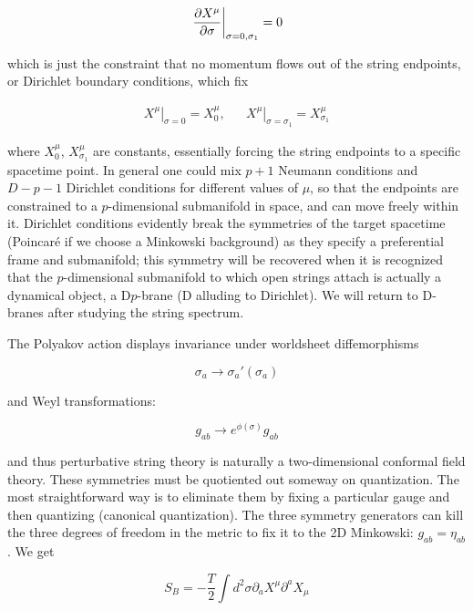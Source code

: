 \begin{equation}
	\left. \frac{\partial X^\mu}{\partial\sigma}\right|_{\sigma = 0,\sigma_1} = 0
	\label{}
\end{equation}

which is just the constraint that no momentum flows out of the string endpoints, or Dirichlet boundary conditions, which fix 

\begin{align}
	\left. X^\mu \right|_{\sigma=0} = X_0^\mu, && \left. X^\mu \right|_{\sigma=\sigma_1} = X^\mu_{\sigma_1}
	\label{}
\end{align}

where $X^\mu_0$, $X^\mu_{\sigma_1}$ are constants, essentially forcing the string endpoints to a specific spacetime point. In general one could mix $p+1$ Neumann conditions and $D-p-1$ Dirichlet conditions for different values of $\mu$, so that the endpoints are constrained to a $p$-dimensional submanifold in space, and can move freely within it. Dirichlet conditions evidently break the symmetries of the target spacetime (Poincar\'e if we choose a Minkowski background) as they specify a preferential frame and submanifold; this symmetry will be recovered when it is recognized that the $p$-dimensional submanifold to which open strings attach is actually a dynamical object, a D$p$-brane (D alluding to Dirichlet). We will return to D-branes after studying the string spectrum.

The Polyakov action displays invariance under worldsheet diffemorphisms 

\begin{equation}
	\sigma_a \rightarrow \sigma_a'(\sigma_a)
	\label{}
\end{equation}

and Weyl transformations:

\begin{equation}
	g_{ab} \rightarrow e^{\phi(\sigma)} g_{ab} 
	\label{}
\end{equation}

and thus perturbative string theory is naturally a two-dimensional conformal field theory. These symmetries must be quotiented out someway on quantization. The most straightforward way is to eliminate them by fixing a particular gauge and then quantizing (canonical quantization). The three symmetry generators can kill the three degrees of freedom in the metric to fix it to the 2D Minkowski: $g_{ab} = \eta_{ab}$. We get

\begin{equation}
S_B = - \frac{T}{2} \int d^2\sigma \partial_a X^\mu \partial^a X_\mu
\end{equation}

